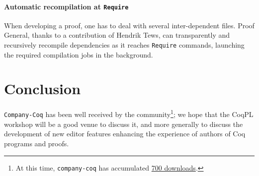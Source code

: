 \documentclass[preprint]{sigplanconf}
\newcommand{\proofg}{Proof General\xspace}
\begin{document}
\paragraph{Automatic recompilation at \texttt{Require}} When developing a proof, one has to deal with several inter-dependent files. \proofg, thanks to a contribution of Hendrik Tews, can transparently and recursively recompile dependencies as it reaches \texttt{Require} commands, launching the required compilation jobs in the background.


\section*{Conclusion}
\texttt{Company-Coq} has been well received by the community\footnote{At this time, \texttt{company-coq} has accumulated \href{http://melpa.org/\#/company-coq}{700 downloads}.}; we hope that the CoqPL workshop will be a good venue to discuss it, and more generally to discuss the development of new editor features enhancing the experience of authors of Coq programs and proofs.



\end{document}
